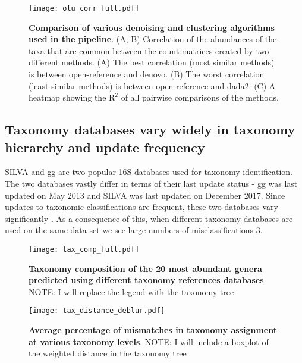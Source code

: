   \begin{figure}[h]
    \centering
    \texttt{[image: otu\_corr\_full.pdf]}
    \caption{
      \textbf{Comparison of various denoising and clustering algorithms used in the pipeline}.
      (A, B) Correlation of the abundances of the taxa that are common between the count matrices created by two different methods.
      (A) The best correlation (most similar methods) is between open-reference and denovo.
      (B) The worst correlation (least similar methods) is between open-reference and dada2.
      (C) A heatmap showing the $\mathrm{R}^2$ of all pairwise comparisons of the methods.
    }
    \label{fig:otu_correlations}
  \end{figure}

  \FloatBarrier

  \subsection*{Taxonomy databases vary widely in taxonomy hierarchy and update frequency}

  SILVA and \ac{gg} are two popular 16S databases used for taxonomy identification.
  The two databases vastly differ in terms of their last update status - \ac{gg} was last updated on May 2013 and SILVA was last updated on December 2017.
  Since updates to taxonomic classifications are frequent, these two databases vary significantly \cite{Balvociute2017}.
  As a consequence of this, when different taxonomy databases are used on the same data-set we see large numbers of misclassifications \ref{fig:tax_mismatches}.

  \begin{figure}[h]
    \centering
    \texttt{[image: tax\_comp\_full.pdf]}
    \caption{\textbf{Taxonomy composition of the 20 most abundant genera predicted using different taxonomy references databases}. NOTE: I will replace the legend with the taxonomy tree}
    \label{fig:tax_comparison}
  \end{figure}

  \begin{figure}[h]
    \centering
    \texttt{[image: tax\_distance\_deblur.pdf]}
    \caption{\textbf{Average percentage of mismatches in taxonomy assignment at various taxonomy levels}. NOTE: I will include a boxplot of the weighted distance in the taxonomy tree}
    \label{fig:tax_mismatches}
  \end{figure}

